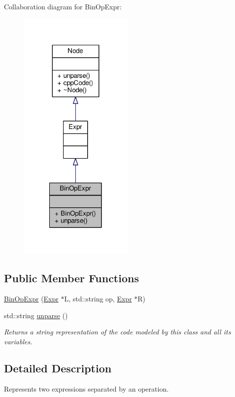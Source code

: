 Collaboration diagram for Bin\-Op\-Expr\-:\nopagebreak
\begin{figure}[H]
\begin{center}
\leavevmode
\includegraphics[width=158pt]{classBinOpExpr__coll__graph}
\end{center}
\end{figure}
\subsection*{Public Member Functions}
\begin{DoxyCompactItemize}
\item 
\hyperlink{classBinOpExpr_a1f1e3308250be423314a06f916a653c5}{Bin\-Op\-Expr} (\hyperlink{classExpr}{Expr} $\ast$L, std\-::string op, \hyperlink{classExpr}{Expr} $\ast$R)
\item 
std\-::string \hyperlink{classBinOpExpr_a1ec35159c20a6b8481ee89ae5829c14d}{unparse} ()
\begin{DoxyCompactList}\small\item\em Returns a string representation of the code modeled by this class and all its variables. \end{DoxyCompactList}\end{DoxyCompactItemize}


\subsection{Detailed Description}
Represents two expressions separated by an operation. \par
 

